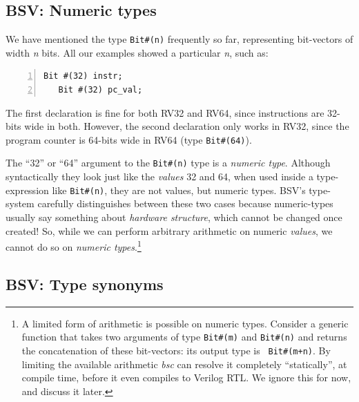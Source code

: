 
\subsection{BSV: Numeric types}

\label{BSV_Numeric_types}

We have mentioned the type \verb|Bit#(n)| frequently so far,
representing bit-vectors of width \emph{n} bits.  All our examples
showed a particular \emph{n}, such as:

\begin{Verbatim}[frame=single, numbers=left]
   Bit #(32) instr;
   Bit #(32) pc_val;
\end{Verbatim}

The first declaration is fine for both RV32 and RV64, since
instructions are 32-bits wide in both.  However, the second
declaration only works in RV32, since the program counter is 64-bits
wide in RV64 (type \verb|Bit#(64)|).

\label{BSV_numeric_types}

The ``32'' or ``64'' argument to the \verb|Bit#(n)| type is a
\emph{numeric type}.  Although syntactically they look just like the
\emph{values} 32 and 64, when used inside a type-expression like
\verb|Bit#(n)|, they are not values, but numeric types.  BSV's
type-system carefully distinguishes between these two cases because
numeric-types usually say something about \emph{hardware structure},
which cannot be changed once created!  So, while we can perform
arbitrary arithmetic on numeric \emph{values}, we cannot do so on
\emph{numeric types}.\footnote{A limited form of arithmetic is
possible on numeric types.  Consider a generic function that takes two
arguments of type {\tt Bit\#(m)} and {\tt Bit\#(n)} and returns the
concatenation of these bit-vectors: its output type is {\tt
Bit\#(m+n)}.  By limiting the available arithmetic \emph{bsc} can
resolve it completely ``statically'', {\ie} at compile time, before it
even compiles to Verilog RTL.  We ignore this for now, and discuss it
later.}


\subsection{BSV: Type synonyms}

\label{BSV_Type_synonyms}

